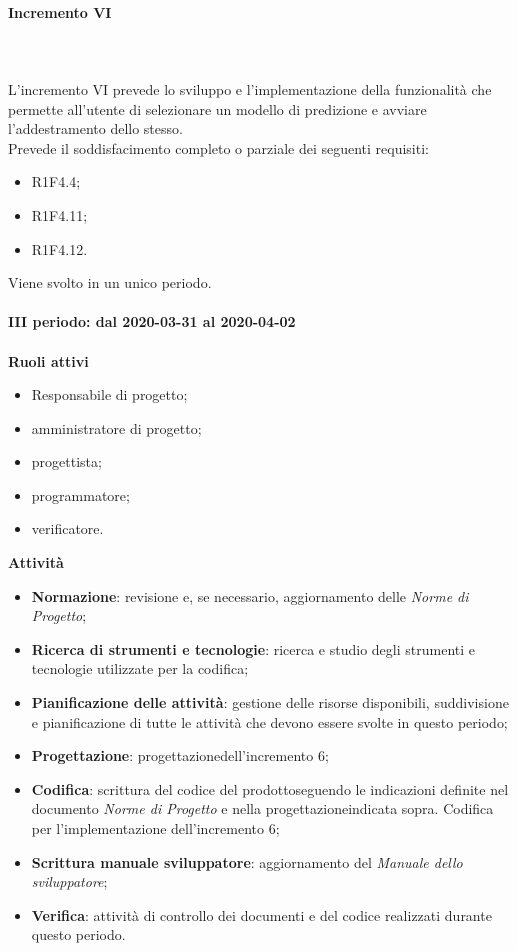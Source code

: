 \paragraph{Incremento VI} \mbox{} \\ \\
L'incremento VI prevede lo sviluppo e l'implementazione della funzionalità che permette all'utente di selezionare un modello di predizione e avviare l'addestramento dello stesso.
\\Prevede il soddisfacimento completo o parziale dei seguenti requisiti:
\begin{itemize}
	\item R1F4.4;
	\item R1F4.11;
	\item R1F4.12.
\end{itemize}
Viene svolto in un unico periodo.
\mbox{} \\ \\ \textbf{III periodo: dal 2020-03-31 al 2020-04-02} \mbox{} \\ \\
\textbf{Ruoli attivi}
\begin{itemize}
	\item Responsabile di progetto\glo;
	\item amministratore di progetto\glo;
	\item progettista;
	\item programmatore;
	\item verificatore.
\end{itemize}
\textbf{Attività} 
\begin{itemize}
	\item \textbf{Normazione}: revisione e, se necessario, aggiornamento delle \textit{Norme di Progetto};
	\item \textbf{Ricerca di strumenti e tecnologie}: ricerca e studio degli strumenti e tecnologie utilizzate per la codifica;
	\item \textbf{Pianificazione delle attività}: gestione delle risorse disponibili, suddivisione e pianificazione di tutte le attività che devono essere svolte in questo periodo;
	\item \textbf{Progettazione}\glo: progettazione\glosp dell'incremento 6;  
	\item \textbf{Codifica}: scrittura del codice del prodotto\glosp seguendo le indicazioni definite nel documento \textit{Norme di Progetto} e nella progettazione\glosp indicata sopra. Codifica per l'implementazione dell'incremento 6;
	\item \textbf{Scrittura manuale sviluppatore}: aggiornamento del \textit{Manuale dello sviluppatore};
	\item \textbf{Verifica}: attività di controllo dei documenti e del codice realizzati durante questo periodo.
\end{itemize}

